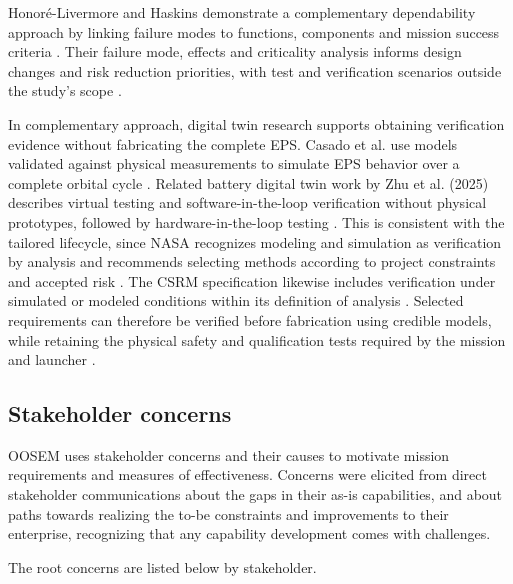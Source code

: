 Honor{\'e}-Livermore and Haskins demonstrate a complementary dependability approach by linking failure modes to functions, components and mission success criteria \citep[Secs.~5--6]{review-0913}.
Their failure mode, effects and criticality analysis informs design changes and risk reduction priorities, with test and verification scenarios outside the study's scope \citep[Secs.~6--7]{review-0913}.

In complementary approach, digital twin research supports obtaining verification evidence without fabricating the complete EPS.
Casado et al. use models validated against physical measurements to simulate EPS behavior over a complete orbital cycle \citep[Secs.~3--4]{review-0573}.
Related battery digital twin work by Zhu et al. (2025) describes virtual testing and software-in-the-loop verification without physical prototypes, followed by hardware-in-the-loop testing \citep[p.~3]{handpicked-0001}.
This is consistent with the tailored lifecycle, since NASA recognizes modeling and simulation as verification by analysis and recommends selecting methods according to project constraints and accepted risk \citep[Sec.~5.3.1.2]{nasa2016systems}.
The CSRM specification likewise includes verification under simulated or modeled conditions within its definition of analysis \citep[Sec.~6.6.8]{omg2025csrm}.
Selected requirements can therefore be verified before fabrication using credible models, while retaining the physical safety and qualification tests required by the mission and launcher \citep[Sec.~5.3.1.2]{nasa2016systems}\citep[Secs.~2.3 and~3]{calpoly2022cds}.

\subsection{Stakeholder concerns}
\label{sec:stakeholder-concerns}

OOSEM uses stakeholder concerns and their causes to motivate mission requirements and measures of effectiveness.
Concerns were elicited from direct stakeholder communications about the gaps in their as-is capabilities, and about paths towards realizing the to-be constraints and improvements to their enterprise, recognizing that any capability development comes with challenges.

The root concerns are listed below by stakeholder.


